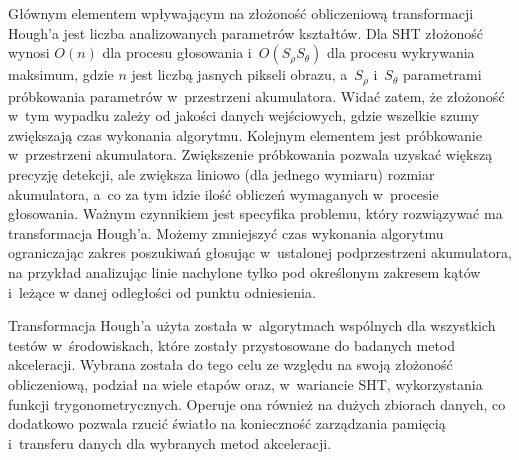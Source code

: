 Głównym elementem wpływającym na złożoność obliczeniową transformacji Hough'a jest liczba analizowanych parametrów kształtów. Dla SHT złożoność wynosi $O(n)$ dla procesu głosowania i~$O(S_\rho S_\theta)$ dla procesu wykrywania maksimum, gdzie $n$ jest liczbą jasnych pikseli obrazu, a~$S_\rho$ i~$S_\theta$ parametrami próbkowania parametrów w~przestrzeni akumulatora. Widać zatem, że złożoność w~tym wypadku zależy od jakości danych wejściowych, gdzie wszelkie szumy zwiększają czas wykonania algorytmu. Kolejnym elementem jest próbkowanie w~przestrzeni akumulatora. Zwiększenie próbkowania pozwala uzyskać większą precyzję detekcji, ale zwiększa liniowo (dla jednego wymiaru) rozmiar akumulatora, a~co za tym idzie ilość obliczeń wymaganych w~procesie głosowania. Ważnym czynnikiem jest specyfika problemu, który rozwiązywać ma transformacja Hough'a. Możemy zmniejszyć czas wykonania algorytmu ograniczając zakres poszukiwań głosując w~ustalonej podprzestrzeni akumulatora, na przykład analizując linie nachylone tylko pod określonym zakresem kątów i~leżące w danej odległości od punktu odniesienia.

Transformacja Hough'a użyta została w~algorytmach wspólnych dla wszystkich testów w~środowiskach, które zostały przystosowane do badanych metod akceleracji. Wybrana została do tego celu ze względu na swoją złożoność obliczeniową, podział na wiele etapów oraz, w~wariancie SHT, wykorzystania funkcji trygonometrycznych. Operuje ona również na dużych zbiorach danych, co dodatkowo pozwala rzucić światło na konieczność zarządzania pamięcią i~transferu danych dla wybranych metod akceleracji. 
